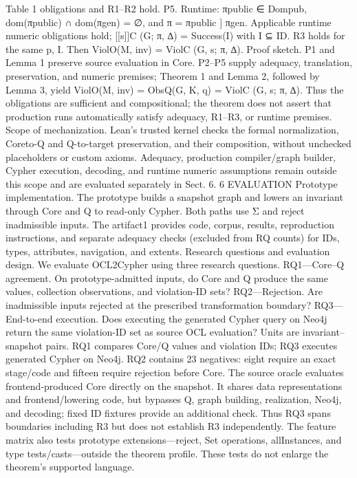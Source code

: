 Table 1 obligations and R1–R2 hold.
P5. Runtime: πpublic ∈ Dompub, dom(πpublic) ∩ dom(πgen) = ∅, and π = πpublic ] πgen.
Applicable runtime numeric obligations hold; [[s]]C (G; π, ∆) = Success(I) with
I ⊆ ID. R3 holds for the same p, I.
Then
ViolO(M, inv) = ViolC (G, s; π, ∆).
Proof sketch. P1 and Lemma 1 preserve source evaluation in Core. P2–P5 supply adequacy, translation, preservation, and numeric premises; Theorem 1 and Lemma 2, followed by Lemma 3, yield
ViolO(M, inv) = ObsQ(G, K, q) = ViolC (G, s; π, ∆).
Thus the obligations are sufficient and compositional; the theorem does not assert that
production runs automatically satisfy adequacy, R1–R3, or runtime premises.
Scope of mechanization. Lean’s trusted kernel checks the formal normalization, Coreto-Q and Q-to-target preservation, and their composition, without unchecked placeholders or custom axioms. Adequacy, production compiler/graph builder, Cypher execution,
decoding, and runtime numeric assumptions remain outside this scope and are evaluated
separately in Sect. 6.
6 EVALUATION
Prototype implementation. The prototype builds a snapshot graph and lowers an invariant through Core and Q to read-only Cypher. Both paths use Σ and reject inadmissible
inputs. The artifact1 provides code, corpus, results, reproduction instructions, and separate adequacy checks (excluded from RQ counts) for IDs, types, attributes, navigation,
and extents.
Research questions and evaluation design. We evaluate OCL2Cypher using three research questions.
RQ1—Core–Q agreement. On prototype-admitted inputs, do Core and Q produce the
same values, collection observations, and violation-ID sets?
RQ2—Rejection. Are inadmissible inputs rejected at the prescribed transformation
boundary?
RQ3—End-to-end execution. Does executing the generated Cypher query on Neo4j
return the same violation-ID set as source OCL evaluation?
Units are invariant–snapshot pairs. RQ1 compares Core/Q values and violation IDs;
RQ3 executes generated Cypher on Neo4j. RQ2 contains 23 negatives: eight require an
exact stage/code and fifteen require rejection before Core. The source oracle evaluates
frontend-produced Core directly on the snapshot. It shares data representations and frontend/lowering code, but bypasses Q, graph building, realization, Neo4j, and decoding;
fixed ID fixtures provide an additional check. Thus RQ3 spans boundaries including R3
but does not establish R3 independently.
The feature matrix also tests prototype extensions—reject, Set operations,
allInstances, and type tests/casts—outside the theorem profile. These tests do
not enlarge the theorem’s supported language.

